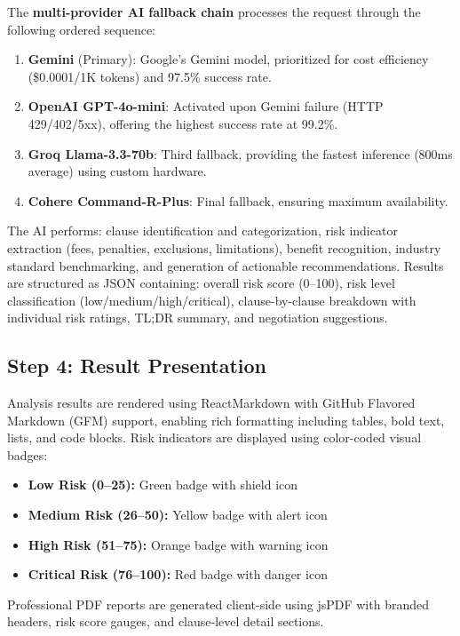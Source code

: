 \documentclass[12pt,a4paper,oneside]{report}
\begin{document}
The \textbf{multi-provider AI fallback chain} processes the request through the following ordered sequence:

\begin{enumerate}[leftmargin=2cm]
  \item \textbf{Gemini} (Primary): Google's Gemini model, prioritized for cost efficiency (\$0.0001/1K tokens) and 97.5\% success rate.
  \item \textbf{OpenAI GPT-4o-mini}: Activated upon Gemini failure (HTTP 429/402/5xx), offering the highest success rate at 99.2\%.
  \item \textbf{Groq Llama-3.3-70b}: Third fallback, providing the fastest inference (800ms average) using custom hardware.
  \item \textbf{Cohere Command-R-Plus}: Final fallback, ensuring maximum availability.
\end{enumerate}

The AI performs: clause identification and categorization, risk indicator extraction (fees, penalties, exclusions, limitations), benefit recognition, industry standard benchmarking, and generation of actionable recommendations. Results are structured as JSON containing: overall risk score (0--100), risk level classification (low/medium/high/critical), clause-by-clause breakdown with individual risk ratings, TL;DR summary, and negotiation suggestions.

\subsection{Step 4: Result Presentation}

Analysis results are rendered using ReactMarkdown with GitHub Flavored Markdown (GFM) support, enabling rich formatting including tables, bold text, lists, and code blocks. Risk indicators are displayed using color-coded visual badges:

\begin{itemize}[leftmargin=2cm]
  \item \textbf{Low Risk (0--25):} Green badge with shield icon
  \item \textbf{Medium Risk (26--50):} Yellow badge with alert icon
  \item \textbf{High Risk (51--75):} Orange badge with warning icon
  \item \textbf{Critical Risk (76--100):} Red badge with danger icon
\end{itemize}

Professional PDF reports are generated client-side using jsPDF with branded headers, risk score gauges, and clause-level detail sections.
\end{document}
